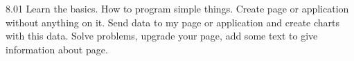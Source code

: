 8.01 Learn the basics. How to program simple things. Create page or application without anything on it.  Send data to my page or application and create charts with this data. Solve problems, upgrade your page, add some text to give information about page. \newline